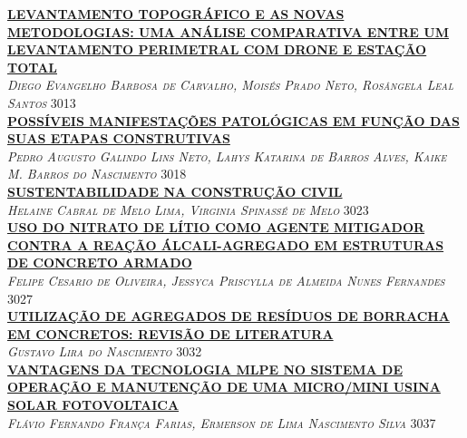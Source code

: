 \noindent \textsc{\hyperlink{trabalhos/251635.pdf.1}{\textbf{LEVANTAMENTO TOPOGRÁFICO E AS NOVAS METODOLOGIAS: UMA ANÁLISE COMPARATIVA ENTRE UM LEVANTAMENTO PERIMETRAL COM DRONE E ESTAÇÃO TOTAL}}}\\ 
\noindent \textsc{\textit{Diego Evangelho Barbosa de Carvalho, Moisés Prado Neto, Rosângela Leal Santos}} \hfill 3013\\ 

\noindent \textsc{\hyperlink{trabalhos/250379.pdf.1}{\textbf{POSSÍVEIS MANIFESTAÇÕES PATOLÓGICAS EM FUNÇÃO DAS SUAS ETAPAS CONSTRUTIVAS}}}\\ 
\noindent \textsc{\textit{Pedro Augusto Galindo Lins Neto, Lahys Katarina de Barros Alves, Kaike M. Barros do Nascimento}} \hfill 3018\\ 

\noindent \textsc{\hyperlink{trabalhos/250144.pdf.1}{\textbf{SUSTENTABILIDADE NA CONSTRUÇÃO CIVIL }}}\\ 
\noindent \textsc{\textit{Helaine Cabral de Melo Lima, Virginia Spinassé de Melo}} \hfill 3023\\ 

\noindent \textsc{\hyperlink{trabalhos/250137.pdf.1}{\textbf{USO DO NITRATO DE LÍTIO COMO AGENTE MITIGADOR CONTRA A REAÇÃO ÁLCALI-AGREGADO EM ESTRUTURAS DE CONCRETO ARMADO}}}\\ 
\noindent \textsc{\textit{Felipe Cesario de Oliveira, Jessyca Priscylla de Almeida Nunes Fernandes}} \hfill 3027\\ 

\noindent \textsc{\hyperlink{trabalhos/251464.pdf.1}{\textbf{UTILIZAÇÃO DE AGREGADOS DE RESÍDUOS DE BORRACHA EM CONCRETOS: REVISÃO DE LITERATURA}}}\\ 
\noindent \textsc{\textit{Gustavo Lira do Nascimento}} \hfill 3032\\ 

\noindent \textsc{\hyperlink{trabalhos/250352.pdf.1}{\textbf{VANTAGENS DA TECNOLOGIA MLPE NO SISTEMA DE OPERAÇÃO E MANUTENÇÃO  DE UMA MICRO/MINI USINA SOLAR FOTOVOLTAICA}}}\\ 
\noindent \textsc{\textit{Flávio Fernando França Farias, Ermerson de Lima Nascimento Silva}} \hfill 3037\\ 

